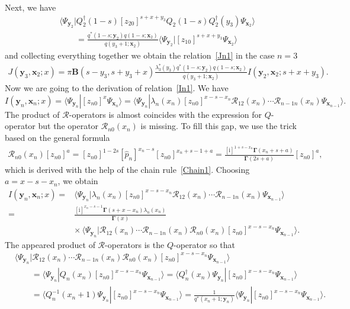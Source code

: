 \documentclass[pdftex]{sigma}
\renewcommand{\imath}{\mathrm{i}}
\numberwithin{equation}{section}
\begin{document}
Next, we have
\begin{align*}
&
\bigl\langle \Psi_{\bm{y}_2}|
Q^{\dagger}_2(1-s)
[z_{20}]^{s+x+y_3}
Q_2(1-s) Q^{\dagger}_2(y_3)
\Psi_{\bm{x}_2}\bigr\rangle \\
& \qquad =
\frac{q^*(1-s;\bm{y}_2) q(1-s;\bm{x}_2)}
{q(y_3+1;\bm{x}_2)}
\langle \Psi_{\bm{y}_2}|[z_{10}]^{s+x+y_3}
\Psi_{\bm{x}_2}\rangle
\end{align*}
and collecting everything together we obtain the relation~\eqref{Jn1}
in the case $n=3$
\begin{align*}
J(\bm{y}_3,\bm{x}_{2};x) =
\pi \mathbf{B}(s-y_3,s+y_3+x)
\frac{\lambda_3^\ast(y_3) q^{*}(1-s;\bm{y}_{2}) q(1-s;\bm{x}_{2})}
{q(y_{3}+1;\bm{x}_{2})}
 I(\bm{y}_{2},\bm{x}_{2};s+x+y_{3}).
\end{align*}
Now we are going to the derivation of relation~\eqref{In1}. We have
\begin{equation*}
I(\bm{y}_n,\bm{x}_{n};x) =
\langle\Psi_{\bm{y}_n}| [z_{n0}]^{x} \Psi_{\bm{x}_{n}}\rangle =
\langle\Psi_{\bm{y}_n}|
\lambda_n(x_n) [z_{n0}]^{x-s-x_n} \mathcal{R}_{12}(x_n)\cdots\mathcal{R}_{n-1 n}(x_n)
\Psi_{\bm{x}_{n-1}}\rangle .
\end{equation*}
The product of $\mathcal{R}$-operators is almost coincides with the
expression for $Q$-operator but the operator $\mathcal{R}_{n0}(x_n)$ is missing.
To fill this gap, we use the trick based on the general formula
\begin{align}\label{Rn0}
\mathcal{R}_{n0}(x_n) [z_{n0}]^{a} =
[z_{n0}]^{1-2s} [\hat{p}_n]^{x_n-s} [z_{n0}]^{x_n+s-1+a} =
\frac{[\imath]^{1+s-x_n} \mathbf{\Gamma}(x_n+s+a)}
{\mathbf{\Gamma}(2s+a)}
[z_{n0}]^{a} ,
\end{align}
which is derived with the help of the chain rule~\eqref{Chain1}.
Choosing $a = x-s-x_n$, we obtain
\begin{align*}
I(\bm{y}_n,\bm{x}_{n};x) ={}& \langle\Psi_{\bm{y}_n}| \lambda_n(x_n)
[z_{n0}]^{x-s-x_n} \mathcal{R}_{12}(x_n)\cdots\mathcal{R}_{n-1 n}(x_n)
\Psi_{\bm{x}_{n-1}}\rangle \\
={}&
\frac{[\imath]^{x_n-s-1} \mathbf{\Gamma}(s+x-x_n) \lambda_n(x_n)}
{\mathbf{\Gamma}(x)} \\
& {\times}\, \langle\Psi_{\bm{y}_n}|
\mathcal{R}_{12}(x_n)\cdots\mathcal{R}_{n-1 n}(x_n)
\mathcal{R}_{n0}(x_n) [z_{n0}]^{x-s-x_n} \Psi_{\bm{x}_{n-1}}\rangle .
\end{align*}
The appeared product of $\mathcal{R}$-operators is the $Q$-operator so that
\begin{align*}
&
\langle\Psi_{\bm{y}_n}|
\mathcal{R}_{12}(x_n)\cdots\mathcal{R}_{n-1 n}(x_n)
\mathcal{R}_{n0}(x_n) [z_{n0}]^{x-s-x_n} \Psi_{\bm{x}_{n-1}}\rangle \\
& \qquad =
\langle\Psi_{\bm{y}_n}| Q_n(x_n) [z_{n0}]^{x-s-x_n} \Psi_{\bm{x}_{n-1}}\rangle =
\bigl\langle Q^{\dagger}_n(x_n)\Psi_{\bm{y}_n}|
 [z_{n0}]^{x-s-x_n} \Psi_{\bm{x}_{n-1}}\bigr\rangle \\
& \qquad =
\langle Q^{-1}_n(x_n+1)\Psi_{\bm{y}_n}|
 [z_{n0}]^{x-s-x_n} \Psi_{\bm{x}_{n-1}}\rangle =
\frac{1}{q^*(x_n+1;\bm{y}_n)} \langle \Psi_{\bm{y}_n}|
 [z_{n0}]^{x-s-x_n} \Psi_{\bm{x}_{n-1}}\rangle .
\end{align*}
\end{document}

